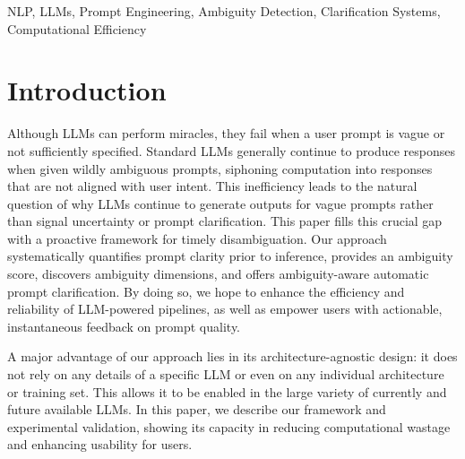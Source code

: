 \documentclass[conference]{IEEEtran}
\begin{document}
\begin{IEEEkeywords}
NLP, LLMs, Prompt Engineering, Ambiguity Detection, Clarification Systems, Computational Efficiency
\end{IEEEkeywords}

%
\IEEEpeerreviewmaketitle



\section{Introduction}
Although LLMs can perform miracles, they fail when a user prompt is vague or not sufficiently specified. Standard LLMs generally continue to produce responses when given wildly ambiguous prompts, siphoning computation into responses that are not aligned with user intent. This inefficiency leads to the natural question of why LLMs continue to generate outputs for vague prompts rather than signal uncertainty or prompt clarification. This paper fills this crucial gap with a proactive framework for timely disambiguation. Our approach systematically quantifies prompt clarity prior to inference, provides an ambiguity score, discovers ambiguity dimensions, and offers ambiguity-aware automatic prompt clarification. By doing so, we hope to enhance the efficiency and reliability of LLM-powered pipelines, as well as empower users with actionable, instantaneous feedback on prompt quality.

A major advantage of our approach lies in its architecture-agnostic design: it does not rely on any details of a specific LLM or even on any individual architecture or training set. This allows it to be enabled in the large variety of currently and future available LLMs. In this paper, we describe our framework and experimental validation, showing its capacity in reducing computational wastage and enhancing usability for users.
\end{document}
